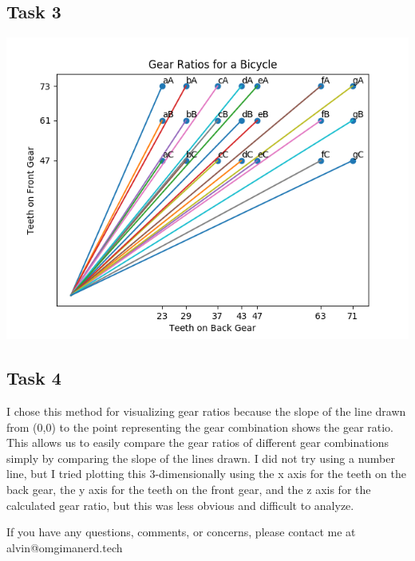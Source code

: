 \documentclass{math}
\begin{document}
\subsection*{Task 3}
\begin{center}
  \includegraphics[width=15cm]{assets/hw_00_task3.png}
\end{center}

\subsection*{Task 4}
I chose this method for visualizing gear ratios because the slope of the line
drawn from (0,0) to the point representing the gear combination shows the gear
ratio. This allows us to easily compare the gear ratios of different gear
combinations simply by comparing the slope of the lines drawn. I did not try
using a number line, but I tried plotting this 3-dimensionally using the x axis
for the teeth on the back gear, the y axis for the teeth on the front gear, and
the z axis for the calculated gear ratio, but this was less obvious and
difficult to analyze.

\begin{center}
  If you have any questions, comments, or concerns, please contact me at
  alvin@omgimanerd.tech
\end{center}
\end{document}

